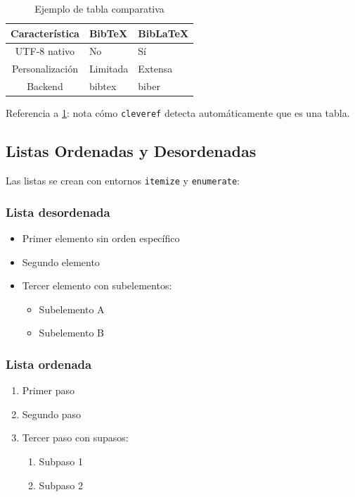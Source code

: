 \documentclass[/work/src/main.tex]{subfiles}
\begin{document}
\begin{table}[h]
    \centering
    \caption{Ejemplo de tabla comparativa}
    \label{tab:comparison}
    \begin{tabularx}{0.8\textwidth}{|c|X|X|}
        \hline
        \textbf{Característica} & \textbf{BibTeX} & \textbf{BibLaTeX} \\
        \hline
        UTF-8 nativo & No & Sí \\
        Personalización & Limitada & Extensa \\
        Backend & bibtex & biber \\
        \hline
    \end{tabularx}
\end{table}

Referencia a \cref{tab:comparison}: nota cómo \texttt{cleveref} detecta automáticamente que es una tabla.

\subsection{Listas Ordenadas y Desordenadas}
Las listas se crean con entornos \texttt{itemize} y \texttt{enumerate}:

\subsubsection{Lista desordenada}
\begin{itemize}
    \item Primer elemento sin orden específico
    \item Segundo elemento
    \item Tercer elemento con subelementos:
    \begin{itemize}
        \item Subelemento A
        \item Subelemento B
    \end{itemize}
\end{itemize}

\subsubsection{Lista ordenada}
\begin{enumerate}
    \item Primer paso
    \item Segundo paso
    \item Tercer paso con supasos:
    \begin{enumerate}
        \item Subpaso 1
        \item Subpaso 2
    \end{enumerate}
\end{enumerate}
\end{document}

